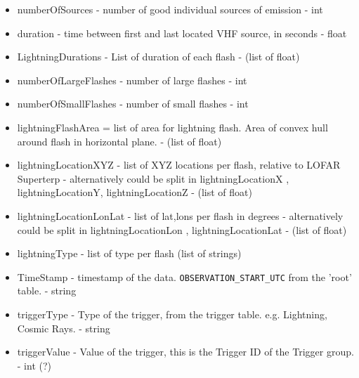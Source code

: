 \documentclass[a4paper,10pt,bibtotoc]{scrartcl}
\begin{document}
\begin{itemize}
    \item numberOfSources - number of good individual sources of emission - int
    \item duration - time between first and last located VHF source, in seconds - float
    \item LightningDurations - List of duration of each flash - (list of float)
    \item numberOfLargeFlashes - number of large flashes - int
    \item numberOfSmallFlashes - number of small flashes - int
    \item lightningFlashArea  = list of area for lightning flash. Area of convex hull around flash in horizontal plane. - (list of float)
    \item lightningLocationXYZ - list of XYZ locations per flash, relative to LOFAR Superterp - alternatively could be split in lightningLocationX , lightningLocationY, lightningLocationZ - (list of float)
    \item lightningLocationLonLat - list of lat,lons per flash in degrees - alternatively could be split in lightningLocationLon , lightningLocationLat - (list of float)
    \item lightningType - list of type per flash (list of strings)
    \item TimeStamp - timestamp of the data. \verb|OBSERVATION_START_UTC| from the 'root' table. - string
    \item triggerType - Type of the trigger, from the trigger table. e.g. Lightning, Cosmic Rays. - string
    \item triggerValue - Value of the trigger, this is the Trigger ID of the Trigger group. - int (?)
\end{itemize}
\end{document}
